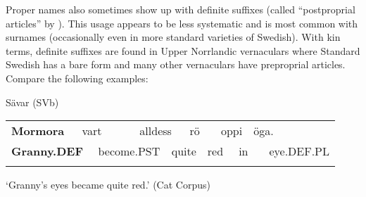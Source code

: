 \begin{styleBodytextC}
Proper names also sometimes show up with definite suffixes (called “postproprial articles” by \citet[23]{Delsing2003a}). This usage appears to be less systematic and is most common with surnames (occasionally even in more standard varieties of Swedish). With kin terms, definite suffixes are found in Upper Norrlandic vernaculars where Standard Swedish has a bare form and many other vernaculars have preproprial articles. Compare the following examples:

\end{styleBodytextC}

\begin{listWWNumileveli}
\item {}

\end{listWWNumileveli}

\begin{listWWNumliileveli}
\item {}

\begin{styleExLtrTbl}
Sävar (SVb)

\end{styleExLtrTbl}

\end{listWWNumliileveli}

\begin{tabular}{llllllllllll}
\lsptoprule
{\bfseries Mormora} & \multicolumn{2}{l}{vart

} & \multicolumn{2}{l}{alldess

} & \multicolumn{2}{l}{rö

} & \multicolumn{2}{l}{oppi

} & \multicolumn{2}{l}{öga.

} & \\
\multicolumn{2}{l}{{\bfseries Granny.DEF}

} & \multicolumn{2}{l}{become.PST

} & \multicolumn{2}{l}{quite

} & \multicolumn{2}{l}{red

} & \multicolumn{2}{l}{in

} & \multicolumn{2}{l}{eye.DEF.PL

}\\
\lspbottomrule
\end{tabular}

\begin{styleTranslation}
‘Granny’s eyes became quite red.’ (Cat Corpus)

\end{styleTranslation}

